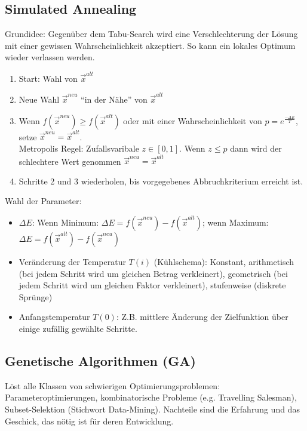 \subsection{Simulated Annealing }
  Grundidee: Gegenüber dem Tabu-Search wird eine Verschlechterung der Lösung mit einer gewissen Wahrscheinlichkeit akzeptiert. So kann ein lokales Optimum wieder verlassen werden.
  
  \begin{enumerate}
    \item Start: Wahl von $\vec{x}^{alt}$
    \item Neue Wahl $\vec{x}^{neu}$ "`in der Nähe"' von $\vec{x}^{alt}$
    \item Wenn $f(\vec{x}^{neu}) \geq f(\vec{x}^{alt})$ oder mit einer Wahrscheinlichkeit von $p = e^{\frac{-\Delta E}{T}}$, setze $\vec{x}^{neu} = \vec{x}^{alt}$.\\
    Metropolis Regel: Zufallsvaribale $z \in [0,1]$. Wenn $z \leq p$ dann wird der schlechtere Wert genommen $\vec{x}^{neu} = \vec{x}^{alt}$
    \item Schritte 2 und 3 wiederholen, bis vorgegebenes Abbruchkriterium erreicht ist.
  \end{enumerate}
  
  Wahl der Parameter:
  \begin{itemize}
    \item $\Delta E$: Wenn Minimum: $\Delta E = f(\vec{x}^{neu}) - f(\vec{x}^{alt})$; wenn Maximum: $\Delta E = f(\vec{x}^{alt}) - f(\vec{x}^{neu})$
    \item Veränderung der Temperatur $T(i)$ (Kühlschema): Konstant, arithmetisch (bei jedem Schritt wird um gleichen Betrag verkleinert), geometrisch (bei jedem Schritt wird um gleichen Faktor verkleinert), stufenweise (diskrete Sprünge)
    \item Anfangstemperatur $T(0)$: Z.B. mittlere Änderung der Zielfunktion über einige zufällig gewählte Schritte.
  \end{itemize}
  

\subsection{Genetische Algorithmen (GA) }
  
    Löst alle Klassen von schwierigen Optimierungsproblemen: Parameteroptimierungen, kombinatorische Probleme (e.g. Travelling Salesman), Subset-Selektion (Stichwort Data-Mining). Nachteile sind die Erfahrung und das Geschick, das nötig ist für deren Entwicklung.
  
